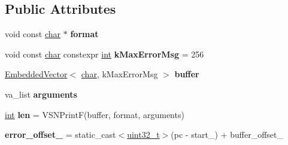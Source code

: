 \subsection*{Public Attributes}
\begin{DoxyCompactItemize}
\item 
\mbox{\label{classv8_1_1internal_1_1wasm_1_1Decoder_ac479b9491a10ff5998e727302cff75c6}} 
void const \mbox{\hyperlink{classchar}{char}} $\ast$ {\bfseries format}
\item 
\mbox{\label{classv8_1_1internal_1_1wasm_1_1Decoder_a56f64aa963b686fbe2665ee50e75cf1c}} 
void const \mbox{\hyperlink{classchar}{char}} constexpr \mbox{\hyperlink{classint}{int}} {\bfseries k\+Max\+Error\+Msg} = 256
\item 
\mbox{\label{classv8_1_1internal_1_1wasm_1_1Decoder_a2442061ad96315bcedb5ffafebf21f86}} 
\mbox{\hyperlink{classv8_1_1internal_1_1EmbeddedVector}{Embedded\+Vector}}$<$ \mbox{\hyperlink{classchar}{char}}, k\+Max\+Error\+Msg $>$ {\bfseries buffer}
\item 
\mbox{\label{classv8_1_1internal_1_1wasm_1_1Decoder_a55613e764412baba9abb80858c89f449}} 
va\+\_\+list {\bfseries arguments}
\item 
\mbox{\label{classv8_1_1internal_1_1wasm_1_1Decoder_add530c92a015d10c9d9a19b423a45c4d}} 
\mbox{\hyperlink{classint}{int}} {\bfseries len} = V\+S\+N\+PrintF(buffer, format, arguments)
\item 
\mbox{\label{classv8_1_1internal_1_1wasm_1_1Decoder_ab30158186d17f300984305bb0332960e}} 
{\bfseries error\+\_\+offset\+\_\+} = static\+\_\+cast$<$\mbox{\hyperlink{classuint32__t}{uint32\+\_\+t}}$>$(pc -\/ start\+\_\+) + buffer\+\_\+offset\+\_\+
\end{DoxyCompactItemize}
